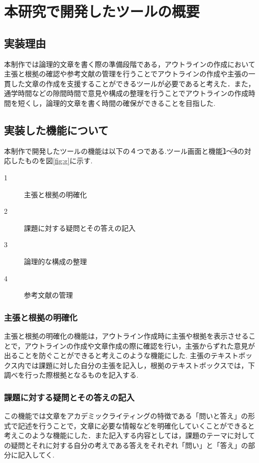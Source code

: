 \documentclass[a4j,12pt]{jarticle}
\begin{document}
\section{本研究で開発したツールの概要}
\subsection{実装理由}
本制作では論理的文章を書く際の準備段階である，アウトラインの作成において主張と根拠の確認や参考文献の管理を行うことでアウトラインの作成や主張の一貫した文章の作成を支援することができるツールが必要であると考えた．また，通学時間などの隙間時間で意見や構成の整理を行うことでアウトラインの作成時間を短くし，論理的文章を書く時間の確保ができることを目指した.

\subsection{実装した機能について}
本制作で開発したツールの機能は以下の４つである.ツール画面と機能\textcircled{\scriptsize 1}〜\textcircled{\scriptsize 4}の対応したものを図\ref{fig:g}に示す.
\begin{description}
  \item[\textcircled{\scriptsize 1}]主張と根拠の明確化
  \item[\textcircled{\scriptsize 2}]課題に対する疑問とその答えの記入
  \item[\textcircled{\scriptsize 3}]論理的な構成の整理
  \item[\textcircled{\scriptsize 4}]参考文献の管理
 \end{description}

\subsubsection{主張と根拠の明確化}
主張と根拠の明確化の機能は，アウトライン作成時に主張や根拠を表示させることで，アウトラインの作成や文章作成の際に確認を行い，主張からずれた意見が出ることを防ぐことができると考えこのような機能にした.
主張のテキストボックス内では課題に対した自分の主張を記入し，根拠のテキストボックスでは，下調べを行った際根拠となるものを記入する.

\subsubsection{課題に対する疑問とその答えの記入}
この機能では文章をアカデミックライティングの特徴である「問いと答え」の形式で記述を行うことで，文章に必要な情報などを明確化していくことができると考えこのような機能にした．また記入する内容としては，課題のテーマに対しての疑問とそれに対する自分の考えである答えをそれぞれ「問い」と「答え」の部分に記入してく.
\end{document}
